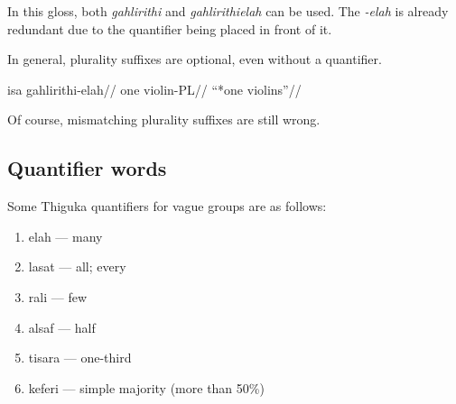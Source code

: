 In this gloss, both \textit{gahlirithi} and \textit{gahlirithielah} can be used.
The \textit{-elah} is already redundant due to the quantifier being placed in front of it.

In general, plurality suffixes are optional, even without a quantifier.

\ex
\begingl
    \gla  isa  gahlirithi-elah//
    \glb  one  violin-PL//
    \glft ``*one violins''//
\endgl
\xe

Of course, mismatching plurality suffixes are still wrong.

\subsection*{Quantifier words}

Some Thiguka quantifiers for vague groups are as follows:
\begin{enumerate}
    \item elah --- many
    \item lasat --- all; every
    \item rali --- few
    \item alsaf --- half
    \item tisara --- one-third
    \item keferi --- simple majority (more than 50\%{})
          
\end{enumerate}

